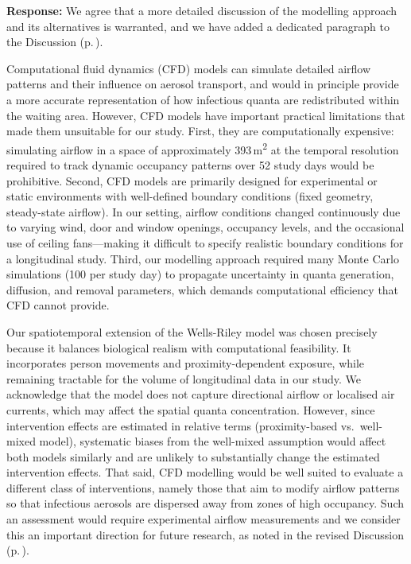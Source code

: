 \documentclass[11pt]{article}
\newcommand{\response}[1]{\textbf{Response:} #1}
\begin{document}
\begin{enumerate}[label=\textbf{R2.\arabic*.}, leftmargin=*]
\response{We agree that a more detailed discussion of the modelling approach and its alternatives is warranted, and we have added a dedicated paragraph to the Discussion (p.\,\pageref{chg:R2.27}).

Computational fluid dynamics (CFD) models can simulate detailed airflow patterns and their influence on aerosol transport, and would in principle provide a more accurate representation of how infectious quanta are redistributed within the waiting area. However, CFD models have important practical limitations that made them unsuitable for our study. First, they are computationally expensive: simulating airflow in a space of approximately 393\,m\textsuperscript{2} at the temporal resolution required to track dynamic occupancy patterns over 52 study days would be prohibitive. Second, CFD models are primarily designed for experimental or static environments with well-defined boundary conditions (fixed geometry, steady-state airflow). In our setting, airflow conditions changed continuously due to varying wind, door and window openings, occupancy levels, and the occasional use of ceiling fans---making it difficult to specify realistic boundary conditions for a longitudinal study. Third, our modelling approach required many Monte Carlo simulations (100 per study day) to propagate uncertainty in quanta generation, diffusion, and removal parameters, which demands computational efficiency that CFD cannot provide.

Our spatiotemporal extension of the Wells-Riley model was chosen precisely because it balances biological realism with computational feasibility. It incorporates person movements and proximity-dependent exposure, while remaining tractable for the volume of longitudinal data in our study. We acknowledge that the model does not capture directional airflow or localised air currents, which may affect the spatial quanta concentration. However, since intervention effects are estimated in relative terms (proximity-based vs.\ well-mixed model), systematic biases from the well-mixed assumption would affect both models similarly and are unlikely to substantially change the estimated intervention effects. That said, CFD modelling would be well suited to evaluate a different class of interventions, namely those that aim to modify airflow patterns so that infectious aerosols are dispersed away from zones of high occupancy. Such an assessment would require experimental airflow measurements and we consider this an important direction for future research, as noted in the revised Discussion (p.\,\pageref{chg:R2.27}).}

\end{enumerate}
\end{document}
